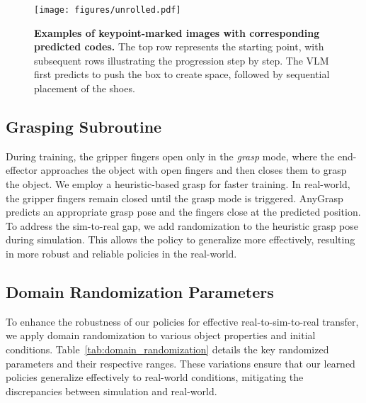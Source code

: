 \begin{figure*}[h!]
    \setlength{\abovecaptionskip}{0pt}
    \texttt{[image: figures/unrolled.pdf]}
    \vspace{0.1em}
    \caption{\small{\textbf{Examples of keypoint-marked images with corresponding predicted codes.} The top row represents the starting point, with subsequent rows illustrating the progression step by step.  The VLM first predicts to push the box to create space, followed by sequential placement of the shoes.}
    \label{fig:unrolled}}
    
\end{figure*}

\subsection{Grasping Subroutine}
\label{sec:grasping}

During training, the gripper fingers open only in the \textit{grasp} mode, where the end-effector approaches the object with open fingers and then closes them to grasp the object. We employ a heuristic-based grasp for faster training. In real-world, the gripper fingers remain closed until the grasp mode is triggered. AnyGrasp predicts an appropriate grasp pose and the fingers close at the predicted position. To address the sim-to-real gap, we add randomization to the heuristic grasp pose during simulation. This allows the policy to generalize more effectively, resulting in more robust and reliable policies in the real-world.

\subsection{Domain Randomization Parameters}
\label{sec:domain_randomization}
To enhance the robustness of our policies for effective real-to-sim-to-real transfer, we apply domain randomization to various object properties and initial conditions. Table~\ref{tab:domain_randomization} details the key randomized parameters and their respective ranges. These variations ensure that our learned policies generalize effectively to real-world conditions, mitigating the discrepancies between simulation and real-world.

